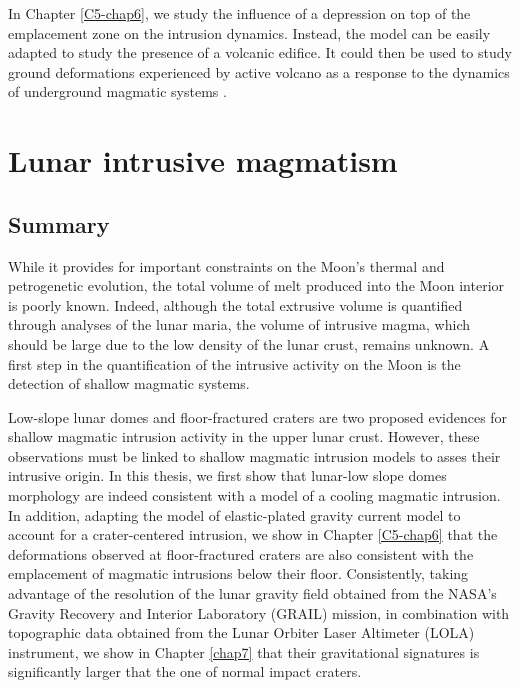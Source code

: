 In Chapter \ref{C5-chap6},  we study the influence of  a depression on
top of the  emplacement zone on the intrusion  dynamics.  Instead, the
model  can be  easily  adapted to  study the  presence  of a  volcanic
edifice.   It  could  then  be   used  to  study  ground  deformations
experienced  by  active volcano  as  a  response  to the  dynamics  of
underground                      magmatic                      systems
\citep{Cayol:2014vo,Pedersen:2004kp,Patane:2006hn,Bonaccorso:2001iw,ChadwickJr:1995cz,Cannavo:2015fk}.

\section*{Lunar intrusive magmatism}

\subsection*{Summary}
\label{sec:summary-1}

While it provides for important  constraints on the Moon's thermal and
petrogenetic evolution,  the total  volume of  melt produced  into the
Moon interior is  poorly known.  Indeed, although  the total extrusive
volume is quantified  through analyses of the lunar  maria, the volume
of intrusive  magma, which should be  large due to the  low density of
the lunar crust,  remains unknown. A first step  in the quantification
of the  intrusive activity  on the  Moon is  the detection  of shallow
magmatic systems.

Low-slope  lunar domes  and floor-fractured  craters are  two proposed
evidences for shallow  magmatic intrusion activity in  the upper lunar
crust. However, these observations must  be linked to shallow magmatic
intrusion models to asses their  intrusive origin.  In this thesis, we
first show that lunar-low slope domes morphology are indeed consistent
with a model  of a cooling magmatic intrusion.   In addition, adapting
the model  of elastic-plated  gravity current model  to account  for a
crater-centered intrusion, we show  in Chapter \ref{C5-chap6} that the
deformations observed  at floor-fractured craters are  also consistent
with  the  emplacement  of  magmatic  intrusions  below  their  floor.
Consistently, taking advantage of the  resolution of the lunar gravity
field  obtained   from  the  NASA’s  Gravity   Recovery  and  Interior
Laboratory  (GRAIL)  mission,  in combination  with  topographic  data
obtained from the Lunar Orbiter  Laser Altimeter (LOLA) instrument, we
show  in Chapter  \ref{chap7} that  their gravitational  signatures is
significantly larger that the one of normal impact craters.

